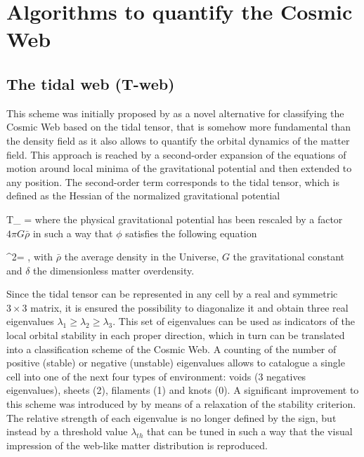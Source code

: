 \documentclass[a4,useAMS,usenatbib,usegraphicx]{latex/mn2e}
\begin{document}
\section{Algorithms to quantify the Cosmic Web}
\label{sec:algorithms_cosmic_web}


\subsection{The tidal web (T-web)}
\label{subsec:Tweb}


This scheme was initially proposed by \citet{Hahn07} as a novel 
alternative for classifying the Cosmic Web based on the tidal tensor, 
that is somehow more fundamental than the density field as it also allows 
to quantify the orbital dynamics of the matter field. This approach is 
reached by a second-order expansion of the equations of motion around 
local minima of the gravitational potential and then extended to any 
position. The second-order term corresponds to the tidal tensor, which is
defined as the Hessian of the normalized gravitational potential


{	T_{\alpha\beta} = 	}
where the physical gravitational potential has been rescaled by a factor 
$4\pi G\bar{\rho}$ in such a way that $\phi$ satisfies the following 
equation


{	\nabla^2\phi = \delta,	}
with $\bar{\rho}$ the average density in the Universe, $G$ the 
gravitational constant and $\delta$ the dimensionless matter overdensity.


Since the tidal tensor can be represented in any cell by a real and 
symmetric $3\times 3$ matrix, it is ensured the possibility to diagonalize 
it and obtain three real eigenvalues $\lambda_{1}\geq\lambda_{2}\geq
\lambda_3$. This set of eigenvalues can be used as indicators of the local 
orbital stability in each proper direction, which in turn can be 
translated into a classification scheme of the Cosmic Web. A counting of 
the number of positive (stable) or negative (unstable) eigenvalues allows 
to catalogue a single cell into one of the next four types of environment: 
voids (3 negatives eigenvalues), sheets (2), filaments (1) and knots (0). 
A significant improvement to this scheme was introduced by \citet{Forero09}
by means of a relaxation of the stability criterion. The relative strength 
of each eigenvalue is no longer defined by the sign, but instead by a
threshold value $\lambda_{th}$ that can be tuned in such a way that the
visual impression of the web-like matter distribution is reproduced.
\end{document}
